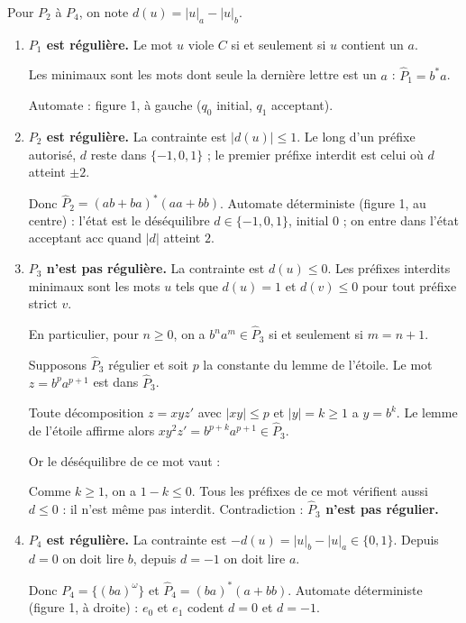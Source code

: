 \documentclass[11pt,a4paper]{article}
\newcommand{\equationajustee}[1]{%
  \sbox{\boiteequation}{$\displaystyle #1$}%
  \ifdim\wd\boiteequation>\linewidth
    \[\resizebox{\linewidth}{!}{\usebox{\boiteequation}}\]%
  \else
    \[#1\]%
  \fi}
\begin{document}
Pour \(P_2\) à \(P_4\), on note \(d(u)=|u|_a-|u|_b\).

\begin{enumerate}
\def\labelenumi{\arabic{enumi}.}
\item
  \textbf{\(P_1\) est régulière.} Le mot \(u\) viole \(C\) si et seulement si \(u\) contient un \(a\).

  Les minimaux sont les mots dont seule la dernière lettre est un \(a\) : \(\hat P_1=b^*a\).

  Automate : figure 1, à gauche (\(q_0\) initial, \(q_1\) acceptant).
\item
  \textbf{\(P_2\) est régulière.} La contrainte est \(|d(u)|\le1\). Le long d'un préfixe autorisé, \(d\) reste dans \(\{-1,0,1\}\) ; le premier préfixe interdit est celui où \(d\) atteint \(\pm2\).

  Donc \(\hat P_2=(ab+ba)^*(aa+bb)\). Automate déterministe (figure 1, au centre) : l'état est le déséquilibre \(d\in\{-1,0,1\}\), initial \(0\) ; on entre dans l'état acceptant \(\mathrm{acc}\) quand \(|d|\) atteint \(2\).
\item
  \textbf{\(P_3\) n'est pas régulière.} La contrainte est \(d(u)\le0\). Les préfixes interdits minimaux sont les mots \(u\) tels que \(d(u)=1\) et \(d(v)\le0\) pour tout préfixe strict \(v\).

  En particulier, pour \(n\ge0\), on a \(b^na^m\in\hat P_3\) si et seulement si \(m=n+1\).

  Supposons \(\hat P_3\) régulier et soit \(p\) la constante du lemme de l'étoile. Le mot \(z=b^pa^{p+1}\) est dans \(\hat P_3\).

  Toute décomposition \(z=xyz'\) avec \(|xy|\le p\) et \(|y|=k\ge1\) a \(y=b^k\). Le lemme de l'étoile affirme alors \(xy^2z'=b^{p+k}a^{p+1}\in\hat P_3\).

  Or le déséquilibre de ce mot vaut :

  \equationajustee{\begin{aligned}d(b^{p+k}a^{p+1})&=(p+1)-(p+k)\\&=1-k.\end{aligned}}

  Comme \(k\ge1\), on a \(1-k\le0\). Tous les préfixes de ce mot vérifient aussi \(d\le0\) : il n'est même pas interdit. Contradiction : \textbf{\(\hat P_3\) n'est pas régulier.}
\item
  \textbf{\(P_4\) est régulière.} La contrainte est \(-d(u)=|u|_b-|u|_a\in\{0,1\}\). Depuis \(d=0\) on doit lire \(b\), depuis \(d=-1\) on doit lire \(a\).

  Donc \(P_4=\{(ba)^\omega\}\) et \(\hat P_4=(ba)^*(a+bb)\). Automate déterministe (figure 1, à droite) : \(e_0\) et \(e_1\) codent \(d=0\) et \(d=-1\).
\end{enumerate}
\end{document}
